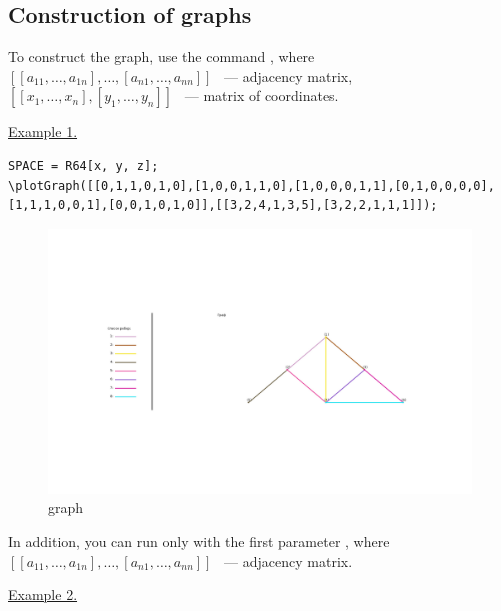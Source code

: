 \subsection{Construction of graphs}
To construct the graph, use the command
, 
where $[[a_{11},\ldots,a_{1n}],\ldots,[a_{n1},\ldots,a_{nn}]]$ ~--- adjacency matrix, $[[x_{1},\ldots, x_{n}],[y_{1},\ldots,y_{n}]]$ ~--- matrix of coordinates.

\underline{Example 1. }

\vspace*{-2mm}
\begin{verbatim}
SPACE = R64[x, y, z];
\plotGraph([[0,1,1,0,1,0],[1,0,0,1,1,0],[1,0,0,0,1,1],[0,1,0,0,0,0],
[1,1,1,0,0,1],[0,0,1,0,1,0]],[[3,2,4,1,3,5],[3,2,2,1,1,1]]);
\end{verbatim}
\begin{figure}[!ht]
 \includegraphics[scale=0.4]{pictures/4_1}
\caption{graph}
\label{4_1}
\end{figure}

In addition, you can run only with the first parameter
, 
where $[[a_{11},\ldots,a_{1n}],\ldots,[a_{n1},\ldots,a_{nn}]]$ ~--- adjacency matrix.

\underline{Example 2. }

